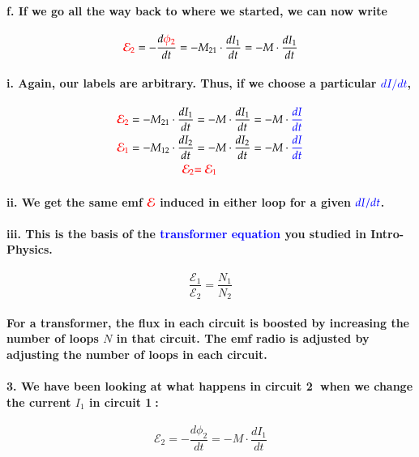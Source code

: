 \documentclass{article}
\begin{document}
\paragraph{\indent f. If we go all the way back to where we started, we can now write}
\begin{equation*}
    \textcolor{red}{\mathcal{E}_2}=-\frac{d\textcolor{red}{\phi_2}}{dt}=-M_{21}\cdot\frac{dI_1}{dt}=-M\cdot\frac{dI_1}{dt}
\end{equation*}
\paragraph{\indent\indent i. Again, our labels are arbitrary. Thus, if we choose a particular \textcolor{blue}{$dI/dt$},}
\begin{align*}
    \textcolor{red}{\mathcal{E}_2}=-M_{21}\cdot\frac{dI_1}{dt}&=-M\cdot\frac{dI_1}{dt}=-M\cdot\textcolor{blue}{\frac{dI}{dt}}\\
    \textcolor{red}{\mathcal{E}_1}=-M_{12}\cdot\frac{dI_2}{dt}&=-M\cdot\frac{dI_2}{dt}=-M\cdot\textcolor{blue}{\frac{dI}{dt}}\\
    \textcolor{red}{\mathcal{E}_2}&\textcolor{red}{=\mathcal{E}_1}\\
\end{align*}
\paragraph{\indent\indent ii. We get the same emf $\textcolor{red}{\mathcal{E}}$ induced in either loop for a given $\textcolor{blue}{dI/dt}$.}
\paragraph{\indent\indent iii. This is the basis of the \textcolor{blue}{transformer equation} you studied in Intro-Physics.}
\begin{equation*}
    \frac{\mathcal{E}_1}{\mathcal{E}_2}=\frac{N_1}{N_2}
\end{equation*}
\paragraph{For a transformer, the flux in each circuit is boosted by increasing the number of loops $N$ in that circuit. The emf radio is adjusted by adjusting the number of loops in each circuit.}
\paragraph{3. We have been looking at what happens in circuit \textcircled{2} when we change the current $I_1$ in circuit \textcircled{1}:}
\begin{equation*}
    \mathcal{E}_2=-\frac{d\phi_2}{dt}=-M\cdot\frac{dI_1}{dt}
\end{equation*}
\end{document}
